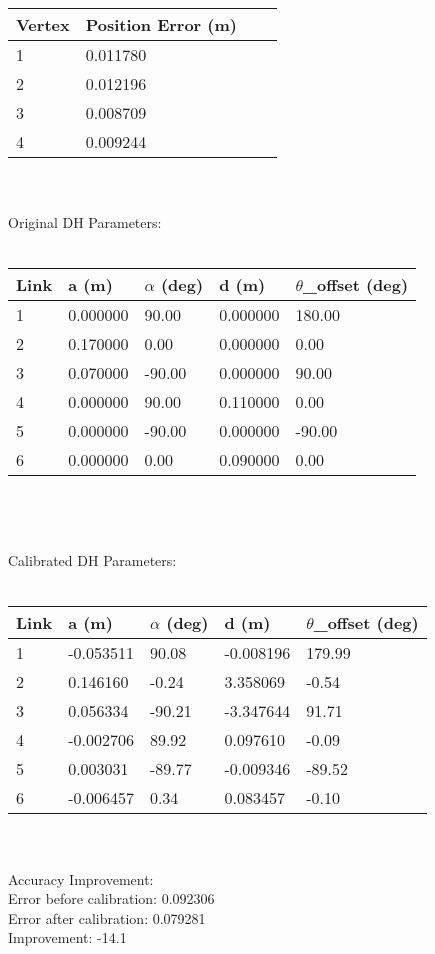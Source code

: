 \documentclass[conference]{IEEEtran}
\begin{document}
\begin{tabular}{llll}
\toprule
Vertex & Position Error (m) \\
\midrule
1 & 0.011780 \\
2 & 0.012196 \\
3 & 0.008709 \\
4 & 0.009244 \\
\bottomrule
\end{tabular}
\\\\


Original DH Parameters:\\\\
\begin{tabular}{lllll}
\toprule
Link & a (m) & $\alpha$ (deg) & d (m) & $\theta$\_offset (deg) \\
\midrule
1 & 0.000000 & 90.00 & 0.000000 & 180.00 \\
2 & 0.170000 & 0.00 & 0.000000 & 0.00 \\
3 & 0.070000 & -90.00 & 0.000000 & 90.00 \\
4 & 0.000000 & 90.00 & 0.110000 & 0.00 \\
5 & 0.000000 & -90.00 & 0.000000 & -90.00 \\
6 & 0.000000 & 0.00 & 0.090000 & 0.00 \\
\bottomrule
\end{tabular}
\\\\\\

Calibrated DH Parameters:\\\\
\begin{tabular}{lllll}
\toprule
Link & a (m) & $\alpha$ (deg) & d (m) & $\theta$\_offset (deg) \\
\midrule
1 & -0.053511 & 90.08 & -0.008196 & 179.99 \\
2 & 0.146160 & -0.24 & 3.358069 & -0.54 \\
3 & 0.056334 & -90.21 & -3.347644 & 91.71 \\
4 & -0.002706 & 89.92 & 0.097610 & -0.09 \\
5 & 0.003031 & -89.77 & -0.009346 & -89.52 \\
6 & -0.006457 & 0.34 & 0.083457 & -0.10 \\
\bottomrule
\end{tabular}
\\\\

Accuracy Improvement:\\
Error before calibration: 0.092306\\
Error after calibration: 0.079281\\
Improvement: -14.1%
\\
\end{document}
